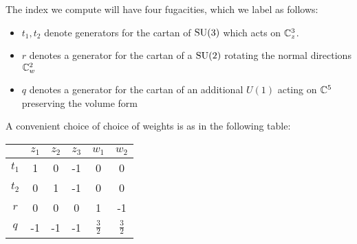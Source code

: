 The index we compute will have four fugacities, which we label as follows:
\begin{itemize}
  \item $t_{1}, t_{2}$ denote generators for the cartan of $\operatorname{SU}(3)$ which acts on $\mathbb{C}^{3}_{z}$.
  \item $r$ denotes a generator for the cartan of a $\operatorname{SU}(2)$ rotating the normal directions $\mathbb{C}^{2}_{w}$
  \item $q$ denotes a generator for the cartan of an additional $U(1)$ acting on $\mathbb{C}^{5}$ preserving the volume form
\end{itemize}

A convenient choice of choice of weights is as in the following table:

\begin{center}
\begin{tabular}{c c c c c c}
  & $z_{1}$ & $z_{2}$ & $z_{3}$ & $w_{1}$ & $w_{2}$ \\
  \hline
  $t_{1}$ & 1 & 0 & -1 & 0 & 0 \\
  $t_{2}$ & 0 & 1 & -1 & 0 & 0 \\
  $r$ & 0 & 0 & 0 & 1 & -1 \\
  $q$ & -1 & -1 & -1 & $\frac{3}{2}$ & $\frac{3}{2}$
\end{tabular}
\end{center}
